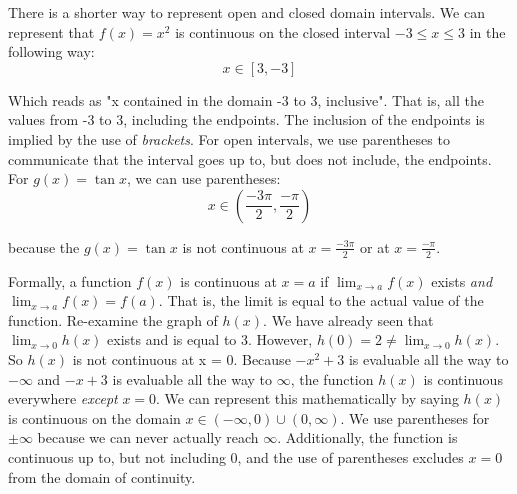There is a shorter way to represent open and closed domain intervals. We can 
represent that $f(x) = x^2$ is continuous on the closed interval $-3 \leq x \leq 3$ 
in the following way: $$x \in \left[3, -3 \right]$$

Which reads as "x contained in the domain -3 to 3, inclusive". That is, all the 
values from -3 to 3, including the endpoints. The inclusion of the endpoints is 
implied by the use of \textit{brackets}. For open intervals, we use parentheses to 
communicate that the interval goes up to, but does not include, the endpoints. For 
$g(x) = \tan{x}$, we can use parentheses: $$x \in \left(\frac{-3\pi}{2}, \frac{-\pi}{2}\right)$$

because the $g(x) = \tan{x}$ is not continuous at $x=\frac{-3\pi}{2}$ or at 
$x=\frac{-\pi}{2}$.



Formally, a function $f(x)$ is continuous at $x=a$ if $\lim_{x\to a}f(x)$ exists 
\textit{and} $\lim_{x\to a}f(x) = f(a)$. That is, the limit is equal to the actual 
value of the function. Re-examine the graph of $h(x)$. We have already seen that $
\lim_{x\to 0}h(x)$ exists and is equal to 3. However, $h(0) = 2 \neq \lim_{x\to0}
h(x)$. So $h(x)$ is not continuous at x = 0. Because $-x^2+3$ is evaluable all the 
way to $-\infty$ and $-x+3$ is evaluable all the way to $\infty$, the function 
$h(x)$ is continuous everywhere \textit{except} $x=0$. We can represent this 
mathematically by saying $h(x)$ is continuous on the domain $x \in \left(-\infty, 
0\right)\cup \left(0, \infty\right)$. We use parentheses for $\pm\infty$ because we 
can never actually reach $\infty$. Additionally, the function is continuous up to, 
but not including $0$, and the use of parentheses excludes $x=0$ from the domain of 
continuity.

